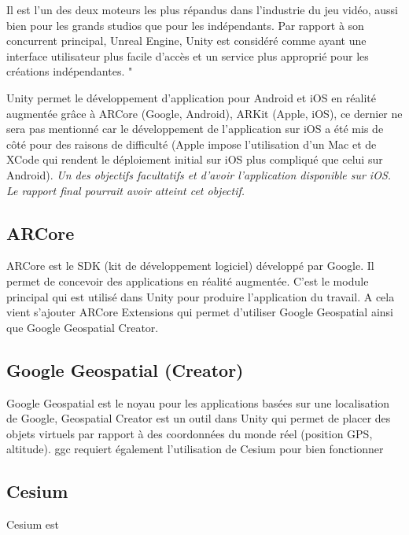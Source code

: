 Il est l'un des deux moteurs les plus répandus dans l'industrie du jeu vidéo,
aussi bien pour les grands studios que pour les indépendants. Par rapport à son concurrent principal,
Unreal Engine, Unity est considéré comme ayant une interface utilisateur plus facile d'accès et un service plus approprié pour les créations indépendantes.
"\cite{UnityMoteurJeu2025}

Unity permet le développement d'application pour Android et iOS en réalité augmentée grâce à ARCore (Google, Android), ARKit (Apple, iOS), ce dernier ne sera pas mentionné car le
développement de l'application sur iOS a été mis de côté pour des raisons de difficulté (Apple impose l'utilisation d'un Mac et de XCode qui rendent le déploiement initial sur iOS plus
compliqué que celui sur Android). \textit{Un des objectifs facultatifs et d'avoir l'application disponible sur iOS. Le rapport final pourrait avoir atteint cet objectif.}

\subsection{ARCore}
ARCore est le SDK (kit de développement logiciel) développé par Google. Il permet de concevoir des applications en réalité augmentée. C'est le module principal qui est utilisé dans Unity pour produire l'application du travail.
A cela vient s'ajouter ARCore Extensions qui permet d'utiliser Google Geospatial ainsi que Google Geospatial Creator.
\subsection{Google Geospatial (Creator)}
Google Geospatial est le noyau pour les applications basées sur une localisation de Google, Geospatial Creator est un outil dans Unity qui permet de placer des objets virtuels par rapport à
des coordonnées du monde réel (position GPS, altitude). \acrshort{ggc} requiert également l'utilisation de Cesium pour bien fonctionner


\subsection{Cesium}
Cesium est

